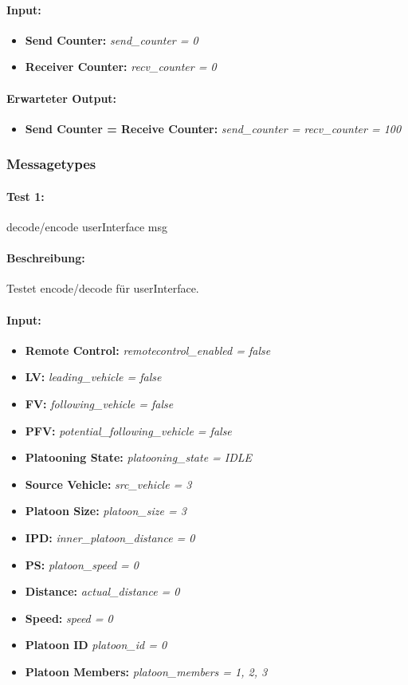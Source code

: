 \documentclass[a4paper, 12pt, titlepage]{scrartcl}
\begin{document}
{			\paragraph{Input:}
			\begin{itemize} \itemsep-0.5em
				\item \textbf{Send Counter:} \emph{send\_counter = 0}
				\item \textbf{Receiver Counter:} \emph{recv\_counter = 0}
			\end{itemize}
			\paragraph{Erwarteter Output:}
			\begin{itemize} \itemsep-0.5em
				\item \textbf{Send Counter = Receive Counter:} \emph{send\_counter = recv\_counter 	= 100}
			\end{itemize}
		
		
			\subsubsection{Messagetypes}
			\label{message_types}
			\paragraph{Test 1:}{decode/encode userInterface msg}
			\paragraph{Beschreibung:} Testet encode/decode für userInterface.
			\paragraph{Input:}
			\begin{itemize} \itemsep-0.5em
				\item \textbf{Remote Control:} \emph{remotecontrol\_enabled = false}
				\item \textbf{LV:} \emph{leading\_vehicle = false}
				\item \textbf{FV:} \emph{following\_vehicle = false}
				\item \textbf{PFV:} \emph{potential\_following\_vehicle = false}
				\item \textbf{Platooning State:} \emph{platooning\_state = IDLE}
				\item \textbf{Source Vehicle:} \emph{src\_vehicle = 3}
				\item \textbf{Platoon Size:} \emph{platoon\_size = 3}
				\item \textbf{IPD:} \emph{inner\_platoon\_distance = 0}
				\item \textbf{PS:} \emph{platoon\_speed = 0}
				\item \textbf{Distance:} \emph{actual\_distance = 0}
				\item \textbf{Speed:} \emph{speed = 0}
				\item \textbf{Platoon ID} \emph{platoon\_id = 0}
				\item \textbf{Platoon Members:} \emph{platoon\_members = {1, 2, 3}}
			\end{itemize}
}
\end{document}
